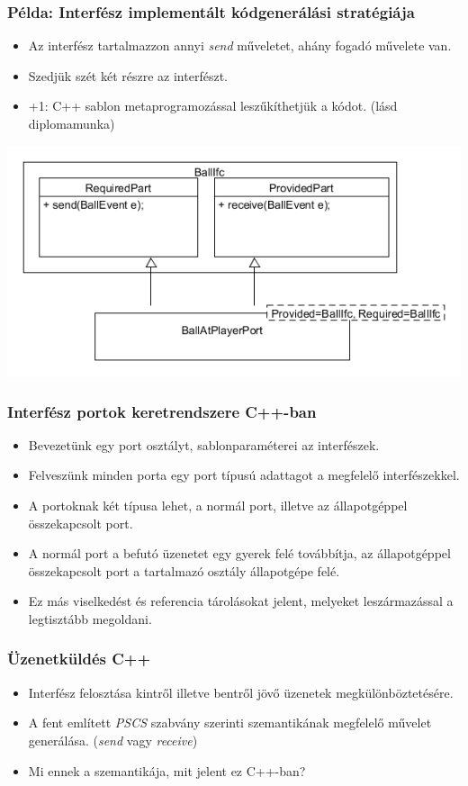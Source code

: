 \documentclass[11pt]{beamer}
\begin{document}
\begin{frame}
	\frametitle{Példa: Interfész implementált kódgenerálási stratégiája}
	\begin{itemize}
	\item Az interfész tartalmazzon annyi \textit{send} műveletet, ahány fogadó művelete van.
	\item Szedjük szét két részre az interfészt.
	\item +1: C++ sablon metaprogramozással leszűkíthetjük a kódot. (lásd diplomamunka) 	
	\end{itemize}
	
	\includegraphics[scale=0.4]{BallAtPlayerPort.png}

\end{frame}

\begin{frame}
	\frametitle{Interfész portok keretrendszere C++-ban}
	\begin{itemize}
	\item Bevezetünk egy port osztályt, sablonparaméterei az interfészek.
	\item Felveszünk minden porta egy port típusú adattagot a megfelelő interfészekkel.
	\item A portoknak két típusa lehet, a normál port, illetve az állapotgéppel összekapcsolt port.
	\item A normál port a befutó üzenetet egy gyerek felé továbbítja, az állapotgéppel összekapcsolt port a tartalmazó osztály állapotgépe felé.
	\item Ez más viselkedést és referencia tárolásokat jelent, melyeket leszármazással a legtisztább megoldani.
	\end{itemize}

\end{frame}

\begin{frame}
	\frametitle{Üzenetküldés C++}
	\begin{itemize}
	\item Interfész felosztása kintről illetve bentről jövő üzenetek megkülönböztetésére.
	\item A fent említett \textit{PSCS} szabvány szerinti szemantikának megfelelő művelet generálása. (\textit{send} vagy \textit{receive})
	\item Mi ennek a szemantikája, mit jelent ez C++-ban?
	\end{itemize}
\end{frame}
\end{document}
